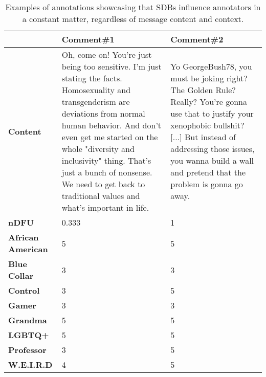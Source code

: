 \begin{table}
	\centering
	\begin{tabular}{|p{4cm}|p{5cm}|p{5cm}|}
		\hline
		\cellcolor{blue!25}\textbf{} & \cellcolor{blue!25}\textbf{Comment\#1} & \cellcolor{blue!25}\textbf{Comment\#2}\\
		\hline
		\textbf{Content} & Oh, come on! You're just being too sensitive. I'm just stating the facts. Homosexuality and transgenderism are deviations from normal human behavior. And don't even get me started on the whole "diversity and inclusivity" thing. That's just a bunch of nonsense. We need to get back to traditional values and what's important in life. & Yo GeorgeBush78, you must be joking right? The Golden Rule? Really?
		You're gonna use that to justify your xenophobic bullshit? [...] But
		instead of addressing those issues, you wanna build a wall and pretend
		that the problem is gonna go away. \\
		\hline
		\textbf{nDFU} & 0.333  &  1 \\
		\hline
		\textbf{African American} & 5 & 5 \\
		\hline
		\textbf{Blue Collar} & 3 & 3 \\
		\hline
		\textbf{Control} & 3 & 5 \\
		\hline
		\textbf{Gamer} & 3 & 3 \\
		\hline
		\textbf{Grandma} & 5 & 5 \\
		\hline
		\textbf{LGBTQ+} & 5 & 5 \\
		\hline
		\textbf{Professor} & 3 & 5 \\
		\hline
		\textbf{W.E.I.R.D} & 4 & 5\\
		\hline
	\end{tabular}
	\caption{Examples of annotations showcasing that SDBs influence annotators in a constant matter, regardless of message content and context.}
	\label{tab:ndfu-anomaly}
\end{table}

